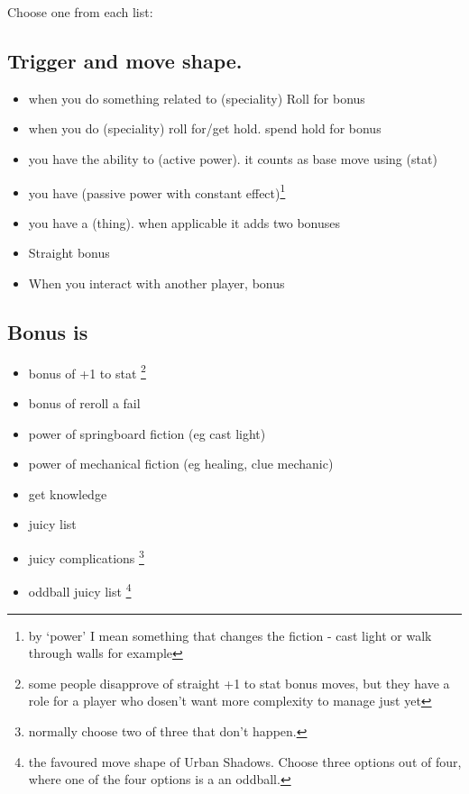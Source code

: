 \documentclass{tufte-handout}
\begin{document}
Choose one from each list:

\subsection{Trigger and move shape.}
\begin{itemize}
\item when you do something related to (speciality) Roll for bonus
\item when you do (speciality) roll for/get hold. spend hold for bonus
\item you have the ability to (active power). it counts as base move using (stat)
\item you have (passive power with constant effect)\footnote{by `power' I mean something that changes the fiction - cast light or walk through walls for example}
\item you have a (thing). when applicable it adds two bonuses
\item Straight bonus
\item When you interact with another player, bonus
\end{itemize}

\subsection{Bonus is}
\begin{itemize}
\item bonus of +1 to stat  \footnote{some people disapprove of straight +1 to stat bonus moves, but they have a role for a player who dosen't want more complexity to manage just yet}
\item bonus of reroll a fail
\item power of springboard fiction (eg cast light)
\item power of mechanical fiction (eg healing, clue mechanic)
\item get knowledge 
\item juicy list
\item juicy complications \footnote{normally choose two of three that don't happen.}
\item oddball juicy list \footnote{the favoured move shape of Urban Shadows. Choose three options out of four, where one of the four options is a an oddball.}
\end{itemize}
\end{document}
